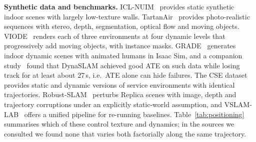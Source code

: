 \documentclass[conference]{IEEEtran}
\begin{document}
\textbf{Synthetic data and benchmarks.} ICL-NUIM~\cite{handa2014iclnuim} provides static synthetic indoor scenes with largely low-texture walls. TartanAir~\cite{wang2020tartanair} provides photo-realistic sequences with stereo, depth, segmentation, optical flow and moving objects. VIODE~\cite{minoda2021viode} renders each of three environments at four dynamic levels that progressively add moving objects, with instance masks. GRADE~\cite{bonetto2023grade} generates indoor dynamic scenes with animated humans in Isaac Sim, and a companion study~\cite{bonetto2023simulation} found that DynaSLAM achieved good ATE on such data while losing track for at least about 27\,s, i.e.\ ATE alone can hide failures. The CSE dataset~\cite{park2024cse} provides static and dynamic versions of service environments with identical trajectories. Robust-SLAM~\cite{xu2024perturbation} perturbs Replica scenes with image, depth and trajectory corruptions under an explicitly static-world assumption, and VSLAM-LAB~\cite{fontan2025vslamlab} offers a unified pipeline for re-running baselines. Table~\ref{tab:positioning} summarises which of these control texture and dynamics; in the sources we consulted we found none that varies both factorially along the same trajectory.
\end{document}
